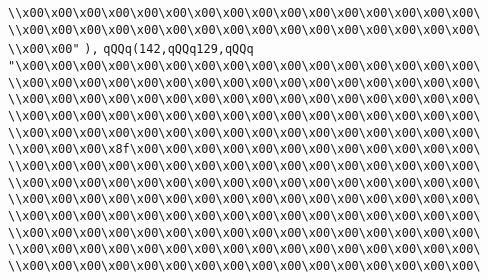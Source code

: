 \verb|\\x00\x00\x00\x00\x00\x00\x00\x00\x00\x00\x00\x00\x00\x00\x00\x00\|\newline
\verb|\\x00\x00\x00\x00\x00\x00\x00\x00\x00\x00\x00\x00\x00\x00\x00\x00\|\newline
\verb|\\x00\x00"|\newline
\verb|),|\newline
\verb|qQQq(142,qQQq129,qQQq|\newline
\verb|"\x00\x00\x00\x00\x00\x00\x00\x00\x00\x00\x00\x00\x00\x00\x00\x00\|\newline
\verb|\\x00\x00\x00\x00\x00\x00\x00\x00\x00\x00\x00\x00\x00\x00\x00\x00\|\newline
\verb|\\x00\x00\x00\x00\x00\x00\x00\x00\x00\x00\x00\x00\x00\x00\x00\x00\|\newline
\verb|\\x00\x00\x00\x00\x00\x00\x00\x00\x00\x00\x00\x00\x00\x00\x00\x00\|\newline
\verb|\\x00\x00\x00\x00\x00\x00\x00\x00\x00\x00\x00\x00\x00\x00\x00\x00\|\newline
\verb|\\x00\x00\x00\x8f\x00\x00\x00\x00\x00\x00\x00\x00\x00\x00\x00\x00\|\newline
\verb|\\x00\x00\x00\x00\x00\x00\x00\x00\x00\x00\x00\x00\x00\x00\x00\x00\|\newline
\verb|\\x00\x00\x00\x00\x00\x00\x00\x00\x00\x00\x00\x00\x00\x00\x00\x00\|\newline
\verb|\\x00\x00\x00\x00\x00\x00\x00\x00\x00\x00\x00\x00\x00\x00\x00\x00\|\newline
\verb|\\x00\x00\x00\x00\x00\x00\x00\x00\x00\x00\x00\x00\x00\x00\x00\x00\|\newline
\verb|\\x00\x00\x00\x00\x00\x00\x00\x00\x00\x00\x00\x00\x00\x00\x00\x00\|\newline
\verb|\\x00\x00\x00\x00\x00\x00\x00\x00\x00\x00\x00\x00\x00\x00\x00\x00\|\newline
\verb|\\x00\x00\x00\x00\x00\x00\x00\x00\x00\x00\x00\x00\x00\x00\x00\x00\|\newline
